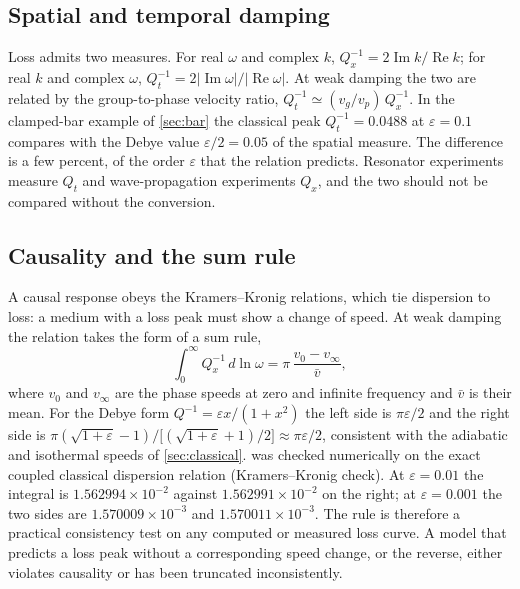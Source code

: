 \subsection{Spatial and temporal damping}
Loss admits two measures. For real $\omega$ and complex $k$, $Q_x^{-1}=2\operatorname{Im}k/\operatorname{Re}k$; for real $k$ and complex $\omega$, $Q_t^{-1}=2|\operatorname{Im}\omega|/|\operatorname{Re}\omega|$. At weak damping the two are related by the group-to-phase velocity ratio, $Q_t^{-1}\simeq(v_g/v_p)\,Q_x^{-1}$. In the clamped-bar example of \cref{sec:bar} the classical peak $Q_t^{-1}=0.0488$ at $\varepsilon=0.1$ compares with the Debye value $\varepsilon/2=0.05$ of the spatial measure. The difference is a few percent, of the order $\varepsilon$ that the relation predicts. Resonator experiments measure $Q_t$ and wave-propagation experiments $Q_x$, and the two should not be compared without the conversion.

\subsection{Causality and the sum rule}
A causal response obeys the Kramers--Kronig relations, which tie dispersion to loss: a medium with a loss peak must show a change of speed. At weak damping the relation takes the form of a sum rule,
\begin{equation}\label{eq:sumrule}
\int_0^\infty Q_x^{-1}\,d\ln\omega=\pi\,\frac{v_0-v_\infty}{\bar v},
\end{equation}
where $v_0$ and $v_\infty$ are the phase speeds at zero and infinite frequency and $\bar v$ is their mean. For the Debye form $Q^{-1}=\varepsilon x/(1+x^2)$ the left side is $\pi\varepsilon/2$ and the right side is $\pi(\sqrt{1+\varepsilon}-1)\big/\bigl[(\sqrt{1+\varepsilon}+1)/2\bigr]\approx\pi\varepsilon/2$, consistent with the adiabatic and isothermal speeds of \cref{sec:classical}.  was checked numerically on the exact coupled classical dispersion relation (Kramers--Kronig check). At $\varepsilon=0.01$ the integral is $1.562994\times10^{-2}$ against $1.562991\times10^{-2}$ on the right; at $\varepsilon=0.001$ the two sides are $1.570009\times10^{-3}$ and $1.570011\times10^{-3}$. The rule is therefore a practical consistency test on any computed or measured loss curve. A model that predicts a loss peak without a corresponding speed change, or the reverse, either violates causality or has been truncated inconsistently.

